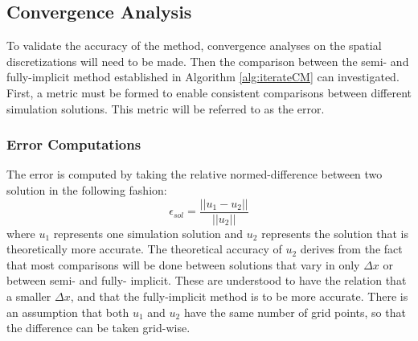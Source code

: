 
\subsection{Convergence Analysis}
  To validate the accuracy of the method, convergence analyses on the spatial discretizations will need to be made. 
  Then the comparison between the semi- and fully-implicit method established in Algorithm \ref{alg:iterateCM} can investigated.
  First, a metric must be formed to enable consistent comparisons between different simulation solutions. 
  This metric will be referred to as the error. %

\subsubsection{Error Computations}

  The error is computed by taking the relative normed-difference between two solution in the following fashion:
  \begin{equation} \label{equ:error_comp}
    \epsilon_{sol} = \frac{||u_1 - u_2||}{||u_2||}
  \end{equation}
  where $u_1$ represents one simulation solution and $u_2$ represents the solution that is theoretically more accurate.
  The theoretical accuracy of $u_2$ derives from the fact that most comparisons will be done between solutions that vary in only $\Delta x$ or between semi- and fully- implicit.
  These are understood to have the relation that a smaller $\Delta x$, and that the fully-implicit method is to be more accurate.
  There is an assumption that both $u_1$ and $u_2$ have the same number of grid points, so that the difference can be taken grid-wise.


